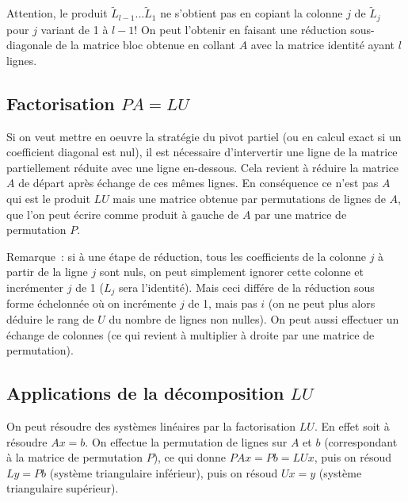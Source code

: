 \documentclass[a4paper,11pt]{book}
\begin{document}
\begin{giacjshere}
Attention, le produit $\tilde{L}_{l-1}...\tilde{L}_1$ ne s'obtient pas en
copiant la colonne $j$ de $\tilde{L}_j$ pour $j$ variant de 1 \`a
$l-1$! On peut l'obtenir en faisant
une r\'eduction sous-diagonale de la matrice bloc obtenue en collant
$A$ avec la matrice identit\'e ayant $l$ lignes.

\subsection{Factorisation $PA=LU$}
Si on veut mettre en oeuvre la strat\'egie du pivot partiel (ou en
calcul exact si un coefficient diagonal est nul), il est n\'ecessaire
d'intervertir une ligne de la matrice partiellement r\'eduite
avec une ligne en-dessous. Cela revient \`a r\'eduire la matrice
$A$ de d\'epart apr\`es \'echange de ces m\^emes lignes. En
cons\'equence ce n'est pas $A$ qui est le produit $LU$ mais
une matrice obtenue par permutations de lignes de $A$, que
l'on peut \'ecrire comme produit \`a gauche de $A$ par une matrice
de permutation $P$.

Remarque~: si \`a une \'etape de r\'eduction, tous les coefficients
de la colonne $j$ \`a partir de la ligne $j$ sont nuls, on peut
simplement ignorer cette colonne et incr\'ementer $j$ de 1 ($L_j$
sera l'identit\'e).
Mais ceci diff\'ere de la r\'eduction sous forme \'echelonn\'ee
o\`u on incr\'emente $j$ de 1, mais pas $i$ (on ne peut plus
alors d\'eduire le rang de $U$ du nombre de lignes non nulles).
On peut aussi effectuer un \'echange de colonnes (ce qui revient
\`a multiplier \`a droite par une matrice de permutation).

\subsection{Applications de la d\'ecomposition $LU$}
On peut r\'esoudre des syst\`emes lin\'eaires par la factorisation
$LU$. En effet soit \`a r\'esoudre $Ax=b$. On effectue la permutation
de lignes sur $A$ et $b$ (correspondant \`a la matrice de permutation
$P$), ce qui donne $PAx=Pb=LUx$, puis on r\'esoud $Ly=Pb$
(syst\`eme triangulaire inf\'erieur), puis on r\'esoud $Ux=y$
(syst\`eme triangulaire sup\'erieur).


\end{giacjshere}
\end{document}
